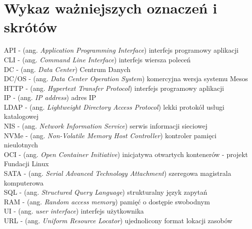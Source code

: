 \documentclass[10pt,a4paper,titlepage,twoside]{report}
\begin{document}
\newpage
{}

\tableofcontents


\newpage
{}
\section*{Wykaz ważniejszych oznaczeń i skrótów}

API - (ang. \textit{Application Programming Interface}) interfejs programowy aplikacji \\ \newline
CLI - (ang. \textit{Command Line Interface}) interfejs wiersza poleceń \\ \newline
DC - (ang. \textit{Data Center}) Centrum Danych \\ \newline
DC/OS - (ang. \textit{Data Center Operation System}) komercyjna wersja systemu Mesos \\ \newline
HTTP - (ang. \textit{Hypertext Transfer Protocol}) interfejs programowy aplikacji \\ \newline
IP - (ang. \textit{IP address}) adres IP \\ \newline
LDAP - (ang. \textit{Lightweight Directory Access Protocol}) lekki protokół usługi katalogowej \\ \newline
NIS - (ang. \textit{Network Information Service}) serwis informacji sieciowej \\ \newline
NVMe - (ang. \textit{Non-Volatile Memory Host Controller}) kontroler pamięci nieulotnych \\ \newline
OCI - (ang. \textit{Open Container Initiative}) inicjatywa otwartych kontenerów - projekt Fundacji Linux \\ \newline
SATA - (ang. \textit{Serial Advanced Technology Attachment}) szeregowa magistrala komputerowa \\ \newline
SQL - (ang. \textit{Structured Query Language}) strukturalny język zapytań \\ \newline
RAM - (ang. \textit{Random access memory}) pamięć o dostępie swobodnym \\ \newline
UI - (ang. \textit{user interface}) interfejs użytkownika \\ \newline
URL - (ang. \textit{Uniform Resource Locator}) ujednolicony format lokacji zasobów \\ \newline
\end{document}
